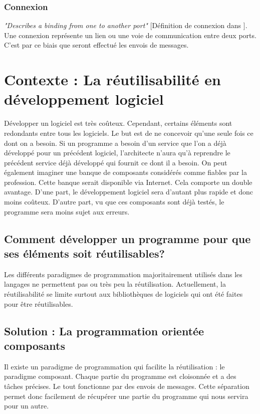 \documentclass[11pt,a4paper,openany,oneside]{book}
\begin{document}
\subsubsection{Connexion}

\textit{"Describes a binding from one to another port"} [Définition de connexion dans \citep{these}].\\
Une connexion représente un lien ou une voie de communication entre deux ports. C'est par ce biais que seront effectué les envois de messages.

\section{Contexte : La réutilisabilité en développement logiciel}

Développer un logiciel est très coûteux. Cependant, certains éléments sont redondants entre tous les logiciels. Le but est de ne concevoir qu'une seule fois ce dont on a besoin. Si un programme a besoin d'un service que l'on a déjà développé pour un précédent logiciel, l'architecte n'aura qu'à reprendre le précédent service déjà développé qui fournit ce dont il a besoin. On peut également imaginer une banque de composants considérés comme fiables par la profession. Cette banque serait disponible via Internet. Cela comporte un double avantage. D'une part, le développement logiciel sera d'autant plus rapide et donc moins coûteux. D'autre part, vu que ces composants sont déjà testés, le programme sera moins sujet aux erreurs.

\subsection{Comment développer un programme pour que ses éléments soit réutilisables?}

Les différents paradigmes de programmation majoritairement utilisés dans les langages ne permettent pas ou très peu la réutilisation. Actuellement, la réutilisabilité se limite surtout aux bibliothèques de logiciels qui ont été faites pour être réutilisables.

\subsection{Solution : La programmation orientée composants}

Il existe un paradigme de programmation qui facilite la réutilisation : le paradigme composant. Chaque partie du programme est cloisonnée et a des tâches précises. Le tout fonctionne par des envois de messages. Cette séparation permet donc facilement de récupérer une partie du programme qui nous servira pour un autre.
\end{document}

